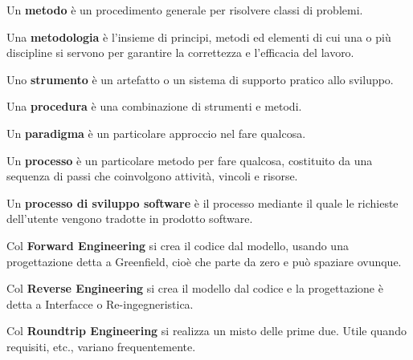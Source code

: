 \documentclass{article}
\begin{document}
    \vspace{3mm}
    
    Un \textbf{metodo} è un procedimento generale per risolvere classi di problemi.
    
    \vspace{3mm}
    
    Una \textbf{metodologia} è l’insieme di principi, metodi ed elementi di cui una o più discipline si servono per garantire la correttezza e l’efficacia del lavoro.
    
    \vspace{3mm}
    
    Uno \textbf{strumento} è un artefatto o un sistema di supporto pratico allo sviluppo.
    
    \vspace{3mm}
    
    Una \textbf{procedura} è una combinazione di strumenti e metodi.
    
    \vspace{3mm}
    
    Un \textbf{paradigma} è un particolare approccio nel fare qualcosa.
    
    \vspace{3mm}
    
    Un \textbf{processo} è un particolare metodo per fare qualcosa, costituito da una sequenza di passi che coinvolgono attività, vincoli e risorse.
    
    \vspace{3mm}
    
    Un \textbf{processo di sviluppo software} è il processo mediante il quale le richieste dell’utente vengono tradotte in prodotto software.
    
    \vspace{3mm}
    
    Col \textbf{Forward Engineering} si crea il codice dal modello, usando una progettazione detta a Greenfield, cioè che parte da zero e può spaziare ovunque.
    
    \vspace{3mm}
    
    Col \textbf{Reverse Engineering} si crea il modello dal codice e la progettazione è detta a Interfacce o Re-ingegneristica. 
    
    \vspace{3mm}
    
    Col \textbf{Roundtrip Engineering} si realizza un misto delle prime due. Utile quando requisiti, etc., variano frequentemente.
    
\end{document}
